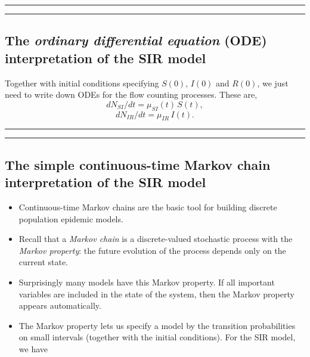 \documentclass[]{article}
\begin{document}
\begin{center}\rule{0.5\linewidth}{\linethickness}\end{center}

\begin{center}\rule{0.5\linewidth}{\linethickness}\end{center}

\subsection{\texorpdfstring{The \emph{ordinary differential equation}
(ODE) interpretation of the SIR
model}{The ordinary differential equation (ODE) interpretation of the SIR model}}\label{the-ordinary-differential-equation-ode-interpretation-of-the-sir-model}

Together with initial conditions specifying \(S(0)\), \(I(0)\) and
\(R(0)\), we just need to write down ODEs for the flow counting
processes. These are, \[ dN_{SI}/dt = \mu_{SI}(t) \, S(t),\]
\[ dN_{IR}/dt = \mu_{IR}\, I(t).\]

\begin{center}\rule{0.5\linewidth}{\linethickness}\end{center}

\begin{center}\rule{0.5\linewidth}{\linethickness}\end{center}

\subsection{The simple continuous-time Markov chain interpretation of
the SIR
model}\label{the-simple-continuous-time-markov-chain-interpretation-of-the-sir-model}

\begin{itemize}
\item
  Continuous-time Markov chains are the basic tool for building discrete
  population epidemic models.
\item
  Recall that a \emph{Markov chain} is a discrete-valued stochastic
  process with the \emph{Markov property}: the future evolution of the
  process depends only on the current state.
\item
  Surprisingly many models have this Markov property. If all important
  variables are included in the state of the system, then the Markov
  property appears automatically.
\item
  The Markov property lets us specify a model by the transition
  probabilities on small intervals (together with the initial
  conditions). For the SIR model, we have
\end{itemize}
\end{document}
